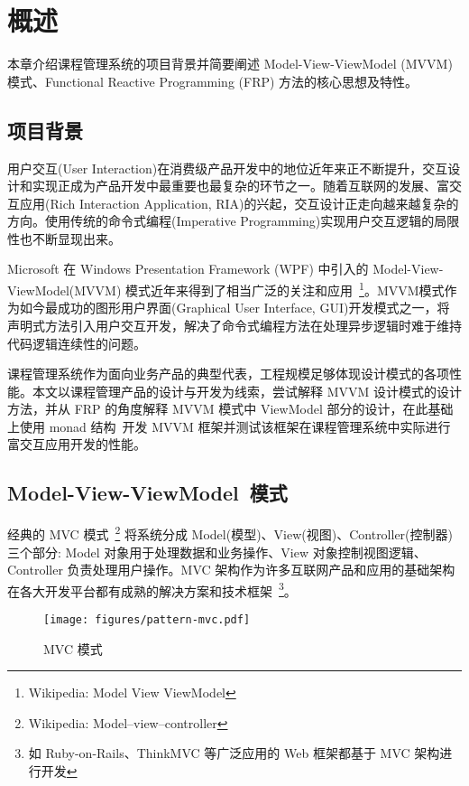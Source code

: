 \chapter{概述}

本章介绍课程管理系统的项目背景并简要阐述 Model-View-ViewModel (MVVM) 模式、Functional Reactive Programming (FRP) 方法的核心思想及特性。

\section{项目背景}

用户交互(User Interaction)在消费级产品开发中的地位近年来正不断提升，交互设计和实现正成为产品开发中最重要也最复杂的环节之一。随着互联网的发展、富交互应用(Rich Interaction Application, RIA)的兴起，交互设计正走向越来越复杂的方向。使用传统的命令式编程(Imperative Programming)实现用户交互逻辑的局限性也不断显现出来。

Microsoft 在 Windows Presentation Framework (WPF) 中引入的 Model-View-ViewModel(MVVM) 模式近年来得到了相当广泛的关注和应用~\footnote{Wikipedia: Model View ViewModel}。MVVM模式作为如今最成功的图形用户界面(Graphical User Interface, GUI)开发模式之一，将声明式方法引入用户交互开发，解决了命令式编程方法在处理异步逻辑时难于维持代码逻辑连续性的问题。

课程管理系统作为面向业务产品的典型代表，工程规模足够体现设计模式的各项性能。本文以课程管理产品的设计与开发为线索，尝试解释 MVVM 设计模式的设计方法，并从 FRP 的角度解释 MVVM 模式中 ViewModel 部分的设计，在此基础上使用 monad 结构~\cite{raey}开发 MVVM 框架并测试该框架在课程管理系统中实际进行富交互应用开发的性能。

\section{Model-View-ViewModel~模式}

经典的 MVC 模式~\footnote{Wikipedia: Model–view–controller} 将系统分成 Model(模型)、View(视图)、Controller(控制器) 三个部分: Model 对象用于处理数据和业务操作、View 对象控制视图逻辑、Controller 负责处理用户操作。MVC 架构作为许多互联网产品和应用的基础架构在各大开发平台都有成熟的解决方案和技术框架~\footnote{如 Ruby-on-Rails、ThinkMVC 等广泛应用的 Web 框架都基于 MVC 架构进行开发}。

\begin{figure}[!h]
\begin{center}
\texttt{[image: figures/pattern-mvc.pdf]}
\caption{MVC 模式\label{MVCOverview}}
\end{center}
\end{figure}

